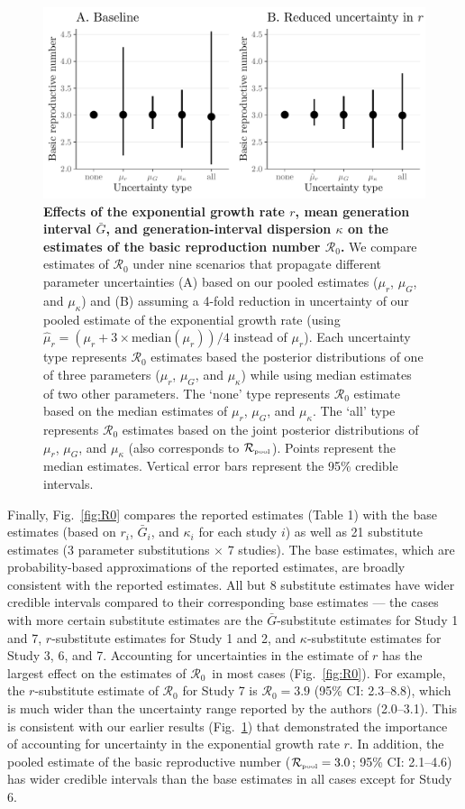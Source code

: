 \documentclass[12pt]{article}
\newcommand{\fref}[1]{Fig.~\ref{fig:#1}}
\newcommand{\Ro}{\ensuremath{{\mathcal R}_{0}}\xspace}
\newcommand{\Rpool}{\ensuremath{{\mathcal R}_{\textrm{\tiny{pool}}}}\xspace}
\begin{document}
\begin{figure}[!ht]
\includegraphics[width=\textwidth]{figure2.pdf}
\caption{
  \textbf{Effects of the exponential growth rate $r$, mean generation interval $\bar G$, and generation-interval dispersion $\kappa$ on the estimates of the basic reproduction number \Ro.}
We compare estimates of \Ro under nine scenarios that propagate different parameter uncertainties (A) based on our pooled estimates ($\mu_r$, $\mu_G$, and $\mu_\kappa$) and (B) assuming a 4-fold reduction in uncertainty of our pooled estimate of the exponential growth rate (using $\hat{\mu}_r = (\mu_r + 3\times\mathrm{median}(\mu_r))/4$ instead of $\mu_r$).
Each uncertainty type represents \Ro estimates based the posterior distributions of one of three parameters ($\mu_r$, $\mu_G$, and $\mu_\kappa$) while using median estimates of two other parameters.
The `none' type represents \Ro estimate based on the median estimates of $\mu_r$, $\mu_G$, and $\mu_\kappa$.
The `all' type represents \Ro estimates based on the joint posterior distributions of  $\mu_r$, $\mu_G$, and $\mu_\kappa$ (also corresponds to \Rpool).
Points represent the median estimates.
Vertical error bars represent the 95\% credible intervals.
}
\label{fig:eff}
\end{figure}

Finally, \fref{R0} compares the reported estimates (Table 1) with the base estimates (based on $r_i$, $\bar G_i$, and $\kappa_i$ for each study $i$) as well as 21 substitute estimates (3 parameter substitutions $\times$ 7 studies).
The base estimates, which are probability-based approximations of the reported estimates, are broadly consistent with the reported estimates.
All but 8 substitute estimates have wider credible intervals compared to their corresponding base estimates --- the cases with more certain substitute estimates are the $\bar G$-substitute estimates for Study 1 and 7, $r$-substitute estimates for Study 1 and 2, and  $\kappa$-substitute estimates for Study 3, 6, and 7.
Accounting for uncertainties in the estimate of $r$ has the largest effect on the estimates of \Ro\ in most cases (\fref{R0}).
For example, the $r$-substitute estimate of \Ro for Study 7 is $\Ro = 3.9$ (95\% CI: 2.3--8.8), which is much wider than the uncertainty range reported by the authors (2.0--3.1).
This is consistent with our earlier results (\fref{eff}) that demonstrated the importance of accounting for uncertainty in the exponential growth rate $r$.
In addition, the pooled estimate of the basic reproductive number ($\Rpool = 3.0$; 95\% CI: 2.1--4.6) has wider credible intervals than the base estimates in all cases except for Study 6.
\end{document}

